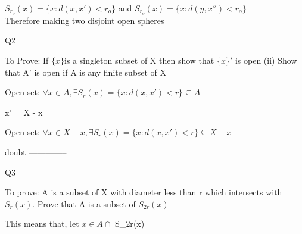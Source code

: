 \documentclass{article}
\begin{document}
$S_{r_o}(x) = \{x: d(x,x') < r_o\}$ and $S_{r_o}(x) = \{x: d(y,x'') < r_o\}$\\

Therefore making two disjoint open spheres

\proof Q2

To Prove: If $ \{x\} $is a singleton subset of X then show that $ \{x\}' $ is open
(ii) Show that A' is open if A is any finite subset of X

Open set: $\forall x \in A ,\exists S_r(x) = \{x: d(x,x') < r\}\subseteq A$

{x}' = X - {x}


Open set: $\forall x \in X - {x} ,\exists S_r(x) = \{x: d(x,x') < r\}\subseteq X - {x}$

doubt --------------

\proof Q3

To prove: A is a subset of X with diameter less than r which intersects with $ S_r(x)$. Prove that A is a subset of $ S_{2r}(x) $  

This means that, let $x \in A \cap $ S_{2r}(x) $  $
\end{document}
